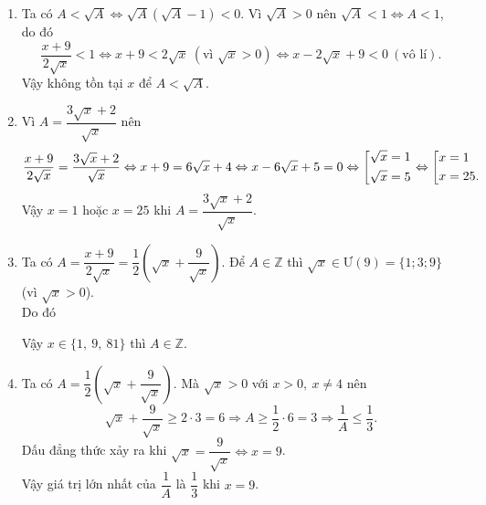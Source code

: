 \begin{bt}
{\begin{enumerate}
\begin{enumerate}
				\item[] Với $ \heva{&\sqrt{x}-9<0\\ &\sqrt{x}-1<0}\Leftrightarrow\heva{&\sqrt{x}<9\\ &\sqrt{x}<1}\Leftrightarrow \sqrt{x}<1\Leftrightarrow x<1 $.
			\end{enumerate}
			Vậy $ x>81 $ hoặc $ 0<x<1 $ thì $ A>5 $.
			\item Ta có $ A<\sqrt{A}\Leftrightarrow \sqrt{A}(\sqrt{A}-1)<0 $. Vì $ \sqrt{A}>0 $ nên $ \sqrt{A}<1\Leftrightarrow A<1 $, do đó
			\[ 
			\dfrac{x+9}{2\sqrt{x}}<1\Leftrightarrow x+9<2\sqrt{x}\ (\text{vì }\sqrt{x}>0)\Leftrightarrow x-2\sqrt{x}+9<0\ (\text{vô lí}).
			\]
			Vậy không tồn tại $ x $ để $ A<\sqrt{A} $.
			\item Vì $ A=\dfrac{3\sqrt{x}+2}{\sqrt{x}} $ nên
			\[
			\dfrac{x+9}{2\sqrt{x}}=\dfrac{3\sqrt{x}+2}{\sqrt{x}}\Leftrightarrow x+9=6\sqrt{x}+4\Leftrightarrow x-6\sqrt{x}+5=0\Leftrightarrow\left[\begin{aligned}&\sqrt{x}=1\\ &\sqrt{x}=5\end{aligned}\right.\Leftrightarrow\left[\begin{aligned}&x=1\\ &x=25.\end{aligned}\right.
			\]
			Vậy $ x=1 $ hoặc $ x=25 $ khi $ A=\dfrac{3\sqrt{x}+2}{\sqrt{x}} $.
			\item Ta có $ A=\dfrac{x+9}{2\sqrt{x}}=\dfrac{1}{2}\left(\sqrt{x}+\dfrac{9}{\sqrt{x}} \right) $. Để $ A\in \mathbb{Z} $ thì $ \sqrt{x}\in\text{Ư}(9)=\{1; 3; 9\} $ (vì $ \sqrt{x}>0 $).\\
			Do đó
			\begin{center}
			\end{center}
			Vậy $ x\in\{1,\ 9,\ 81\} $ thì $ A\in\mathbb{Z} $.
			\item Ta có $ A=\dfrac{1}{2}\left(\sqrt{x}+\dfrac{9}{\sqrt{x}} \right) $. Mà $ \sqrt{x}> 0 $ với $ x>0,\ x\neq 4 $ nên
			\[ 
			\sqrt{x}+\dfrac{9}{\sqrt{x}}\geq 2\cdot 3=6\Rightarrow A\geq \dfrac{1}{2}\cdot 6=3\Rightarrow \dfrac{1}{A}\leq \dfrac{1}{3}.
			\]
			Dấu đẳng thức xảy ra khi $ \sqrt{x}=\dfrac{9}{\sqrt{x}}\Leftrightarrow x=9 $.\\
			 Vậy giá trị lớn nhất của $ \dfrac{1}{A} $ là $ \dfrac{1}{3} $ khi $ x=9 $.
		\end{enumerate}
	}
\end{bt}
